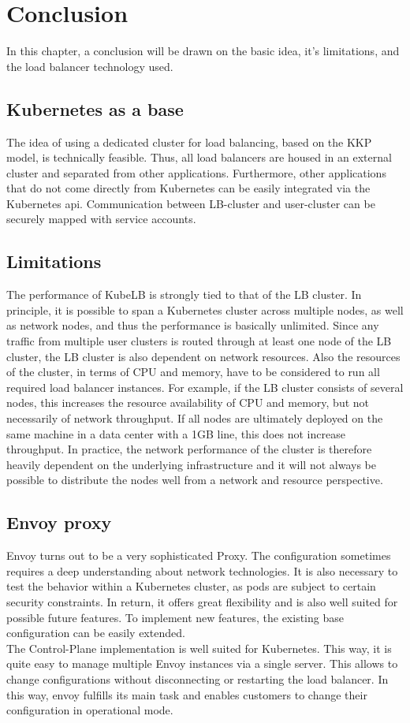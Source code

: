 \chapter{Conclusion}

In this chapter, a conclusion will be drawn on the basic idea, it's limitations, and the load balancer technology used.

\section{Kubernetes as a base}
The idea of using a dedicated cluster for load balancing, based on the KKP model, is technically feasible.
Thus, all load balancers are housed in an external cluster and separated from other applications.
Furthermore, other applications that do not come directly from Kubernetes can be easily integrated via the Kubernetes api.
Communication between LB-cluster and user-cluster can be securely mapped with service accounts.

\section{Limitations}
The performance of KubeLB is strongly tied to that of the LB cluster.
In principle, it is possible to span a Kubernetes cluster across multiple nodes, as well as network nodes, and thus the performance is basically unlimited.
Since any traffic from multiple user clusters is routed through at least one node of the LB cluster, the LB cluster is also dependent on network resources.
Also the resources of the cluster, in terms of CPU and memory, have to be considered to run all required load balancer instances.
For example, if the LB cluster consists of several nodes, this increases the resource availability of CPU and memory, but not necessarily of network throughput.
If all nodes are ultimately deployed on the same machine in a data center with a 1GB line, this does not increase throughput.
In practice, the network performance of the cluster is therefore heavily dependent on the underlying infrastructure and it will not always be possible to distribute the nodes well from a network and resource perspective.

\section{Envoy proxy}
Envoy turns out to be a very sophisticated Proxy.
The configuration sometimes requires a deep understanding about network technologies.
It is also necessary to test the behavior within a Kubernetes cluster, as pods are subject to certain security constraints.
In return, it offers great flexibility and is also well suited for possible future features.
To implement new features, the existing base configuration can be easily extended.
\\
The Control-Plane implementation is well suited for Kubernetes.
This way, it is quite easy to manage multiple Envoy instances via a single server.
This allows to change configurations without disconnecting or restarting the load balancer.
In this way, envoy fulfills its main task and enables customers to change their configuration in operational mode.
